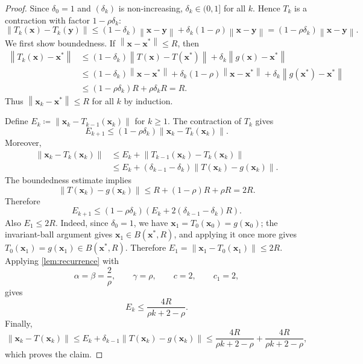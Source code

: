 \documentclass[letterpaper,11pt]{article}
\newcommand{\norm}[1]{\left\| #1 \right\|}
\newcommand{\vect}[1]{\mathbf{#1}}
\begin{document}
\begin{proof}
Since $\delta_0=1$ and $(\delta_k)$ is non-increasing, $\delta_k\in(0,1]$ for all $k$. Hence $T_k$ is a contraction with factor $1-\rho\delta_k$:
\[
    \norm{T_k(\vect{x})-T_k(\vect{y})}
    \le (1-\delta_k)\norm{\vect{x}-\vect{y}}
       +\delta_k(1-\rho)\norm{\vect{x}-\vect{y}}
    =(1-\rho\delta_k)\norm{\vect{x}-\vect{y}}.
\]
We first show boundedness. If $\norm{\vect{x}-\vect{x}^*}\le R$, then
\begin{align*}
    \norm{T_k(\vect{x})-\vect{x}^*}
    &\le (1-\delta_k)\norm{T(\vect{x})-T(\vect{x}^*)}
       +\delta_k\norm{g(\vect{x})-\vect{x}^*} \\
    &\le (1-\delta_k)\norm{\vect{x}-\vect{x}^*}
       +\delta_k(1-\rho)\norm{\vect{x}-\vect{x}^*}
       +\delta_k\norm{g(\vect{x}^*)-\vect{x}^*} \\
    &\le (1-\rho\delta_k)R+\rho\delta_k R
    =R.
\end{align*}
Thus $\norm{\vect{x}_k-\vect{x}^*}\le R$ for all $k$ by induction.

Define $E_k\coloneqq\norm{\vect{x}_k-T_{k-1}(\vect{x}_k)}$ for $k\ge1$. The contraction of $T_k$ gives
\[
    E_{k+1}\le (1-\rho\delta_k)\norm{\vect{x}_k-T_k(\vect{x}_k)}.
\]
Moreover,
\begin{align*}
    \norm{\vect{x}_k-T_k(\vect{x}_k)}
    &\le E_k+\norm{T_{k-1}(\vect{x}_k)-T_k(\vect{x}_k)} \\
    &\le E_k+(\delta_{k-1}-\delta_k)\norm{T(\vect{x}_k)-g(\vect{x}_k)}.
\end{align*}
The boundedness estimate implies
\[
    \norm{T(\vect{x}_k)-g(\vect{x}_k)}
    \le R+(1-\rho)R+\rho R=2R.
\]
Therefore
\[
    E_{k+1}\le (1-\rho\delta_k)\left(E_k+2(\delta_{k-1}-\delta_k)R\right).
\]
Also \(E_1\le2R\). Indeed, since \(\delta_0=1\), we have \(\vect{x}_1=T_0(\vect{x}_0)=g(\vect{x}_0)\); the invariant-ball argument gives \(\vect{x}_1\in B(\vect{x}^*,R)\), and applying it once more gives \(T_0(\vect{x}_1)=g(\vect{x}_1)\in B(\vect{x}^*,R)\). Therefore \(E_1=\norm{\vect{x}_1-T_0(\vect{x}_1)}\le2R\). Applying \cref{lem:recurrence} with
\[
    \alpha=\beta=\frac{2}{\rho},\qquad \gamma=\rho,\qquad c=2,\qquad c_1=2,
\]
gives
\[
    E_k\le \frac{4R}{\rho k+2-\rho}.
\]
Finally,
\[
    \norm{\vect{x}_k-T(\vect{x}_k)}
    \le E_k+\delta_{k-1}\norm{T(\vect{x}_k)-g(\vect{x}_k)}
    \le \frac{4R}{\rho k+2-\rho}
       +\frac{4R}{\rho k+2-\rho},
\]
which proves the claim.
\end{proof}


\clearpage


\end{document}
